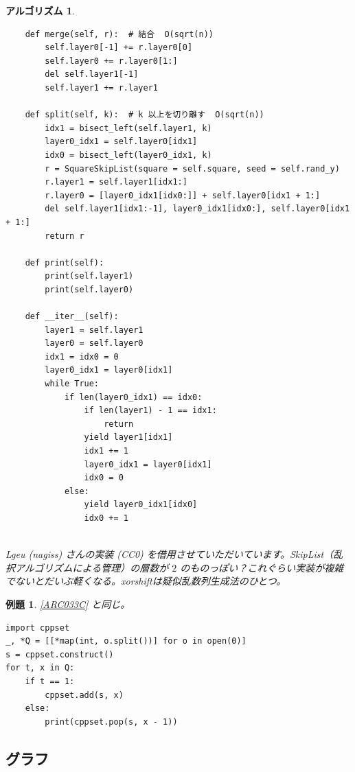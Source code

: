 \documentclass[12pt, a4j]{ltjsarticle}
\newtheorem{alg}[thm]{アルゴリズム}
\newtheorem{exm}[thm]{例題}
\newcommand*{\SS}{\vspace{1cm}}
\begin{document}
\begin{alg}
\begin{lstlisting}
    def merge(self, r):  # 結合  O(sqrt(n))
        self.layer0[-1] += r.layer0[0]
        self.layer0 += r.layer0[1:]
        del self.layer1[-1]
        self.layer1 += r.layer1

    def split(self, k):  # k 以上を切り離す  O(sqrt(n))
        idx1 = bisect_left(self.layer1, k)
        layer0_idx1 = self.layer0[idx1]
        idx0 = bisect_left(layer0_idx1, k)
        r = SquareSkipList(square = self.square, seed = self.rand_y)
        r.layer1 = self.layer1[idx1:]
        r.layer0 = [layer0_idx1[idx0:]] + self.layer0[idx1 + 1:]
        del self.layer1[idx1:-1], layer0_idx1[idx0:], self.layer0[idx1 + 1:]
        return r

    def print(self):
        print(self.layer1)
        print(self.layer0)

    def __iter__(self):
        layer1 = self.layer1
        layer0 = self.layer0
        idx1 = idx0 = 0
        layer0_idx1 = layer0[idx1]
        while True:
            if len(layer0_idx1) == idx0:
                if len(layer1) - 1 == idx1:
                    return
                yield layer1[idx1]
                idx1 += 1
                layer0_idx1 = layer0[idx1]
                idx0 = 0
            else:
                yield layer0_idx1[idx0]
                idx0 += 1
\end{lstlisting}
\quad\\
Lgeu (nagiss) さんの実装 (CC0) を借用させていただいています。SkipList（乱択アルゴリズムによる管理）の層数が $2$ のものっぽい？これぐらい実装が複雑でないとだいぶ軽くなる。xorshiftは疑似乱数列生成法のひとつ。
\end{alg}

\SS

\begin{exm} \upshape \ref{ARC033C} と同じ。\\
\begin{lstlisting}
import cppset
_, *Q = [[*map(int, o.split())] for o in open(0)]
s = cppset.construct()
for t, x in Q:
    if t == 1:
        cppset.add(s, x)
    else:
        print(cppset.pop(s, x - 1))
\end{lstlisting}
\end{exm}

\newpage

\subsection{グラフ}


%
\end{document}
